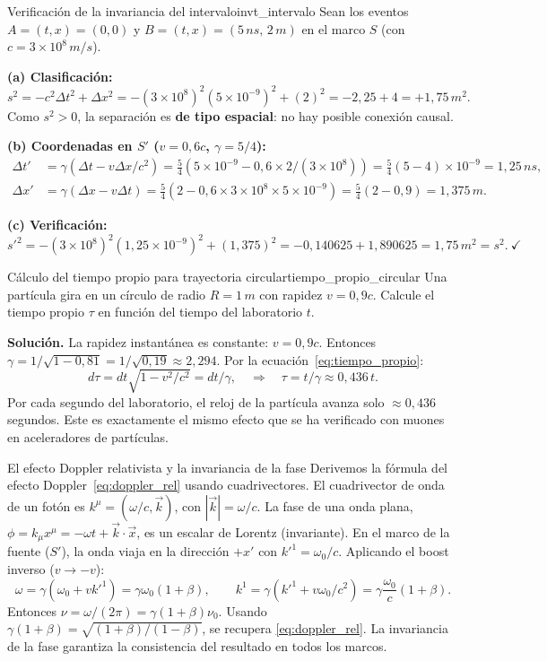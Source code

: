 \begin{ejemplo}{Verificación de la invariancia del intervalo}{invt_intervalo}
Sean los eventos $A = (t, x) = (0, 0)$ y $B = (t, x) = (5\,\si{ns},\, 2\,\si{m})$ en el marco $S$ (con $c = 3\times10^8\,\si{m/s}$).

\textbf{(a) Clasificación:}
\[
  s^2 = -c^2\Delta t^2 + \Delta x^2 = -(3\times10^8)^2(5\times10^{-9})^2 + (2)^2
  = -2{,}25 + 4 = +1{,}75\,\si{m^2}.
\]
Como $s^2 > 0$, la separación es \textbf{de tipo espacial}: no hay posible conexión causal.

\textbf{(b) Coordenadas en $S'$ ($v = 0{,}6c$, $\gamma = 5/4$):}
\begin{align*}
  \Delta t' &= \gamma(\Delta t - v\Delta x/c^2) = \tfrac{5}{4}(5\times10^{-9} - 0{,}6 \times 2/(3\times10^8))
  = \tfrac{5}{4}(5 - 4)\times10^{-9} = 1{,}25\,\si{ns},\\
  \Delta x' &= \gamma(\Delta x - v\Delta t) = \tfrac{5}{4}(2 - 0{,}6\times3\times10^8\times5\times10^{-9})
  = \tfrac{5}{4}(2 - 0{,}9) = 1{,}375\,\si{m}.
\end{align*}

\textbf{(c) Verificación:}
\[
  s'^2 = -(3\times10^8)^2(1{,}25\times10^{-9})^2 + (1{,}375)^2
  = -0{,}140625 + 1{,}890625 = 1{,}75\,\si{m^2} = s^2.\ \checkmark
\]
\end{ejemplo}

\begin{ejemplo}{Cálculo del tiempo propio para trayectoria circular}{tiempo_propio_circular}
Una partícula gira en un círculo de radio $R = 1\,\si{m}$ con rapidez $v = 0{,}9c$. Calcule el tiempo propio $\tau$ en función del tiempo del laboratorio $t$.

\textbf{Solución.} La rapidez instantánea es constante: $v = 0{,}9c$. Entonces $\gamma = 1/\sqrt{1-0{,}81} = 1/\sqrt{0{,}19} \approx 2{,}294$. Por la ecuación~\eqref{eq:tiempo_propio}:
\[
  d\tau = dt\sqrt{1 - v^2/c^2} = dt/\gamma,
  \quad\Rightarrow\quad
  \tau = t/\gamma \approx 0{,}436\,t.
\]
Por cada segundo del laboratorio, el reloj de la partícula avanza solo $\approx 0{,}436$ segundos. Este es exactamente el mismo efecto que se ha verificado con muones en aceleradores de partículas.
\end{ejemplo}

\begin{ejemplo}{El efecto Doppler relativista y la invariancia de la fase}{}
Derivemos la fórmula del efecto Doppler~\eqref{eq:doppler_rel} usando cuadrivectores. El cuadrivector de onda de un fotón es $k^\mu = (\omega/c, \vec{k})$, con $|\vec{k}| = \omega/c$. La fase de una onda plana, $\phi = k_\mu x^\mu = -\omega t + \vec{k}\cdot\vec{x}$, es un escalar de Lorentz (invariante). En el marco de la fuente ($S'$), la onda viaja en la dirección $+x'$ con $k'^1 = \omega_0/c$. Aplicando el boost inverso ($v \to -v$):
\[
  \omega = \gamma(\omega_0 + v k'^1) = \gamma\omega_0(1 + \beta),
  \qquad
  k^1 = \gamma(k'^1 + v\omega_0/c^2) = \gamma\frac{\omega_0}{c}(1+\beta).
\]
Entonces $\nu = \omega/(2\pi) = \gamma(1+\beta)\nu_0$. Usando $\gamma(1+\beta) = \sqrt{(1+\beta)/(1-\beta)}$, se recupera \eqref{eq:doppler_rel}. La invariancia de la fase garantiza la consistencia del resultado en todos los marcos.
\end{ejemplo}

